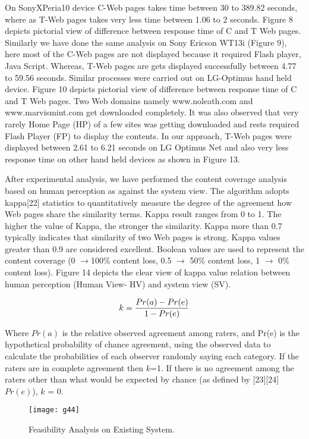 \documentclass[fleqn,twoside]{article}
\begin{document}
On SonyXPeria10 device C-Web pages takes time between 30 to 389.82 seconds, where as T-Web pages takes very less time between 1.06 to 2 seconds. Figure 8 depicts pictorial view of difference between response time of C and T Web pages. Similarly we have done the same analysis on Sony Ericson WT13i (Figure 9), here most of the C-Web pages are not displayed because it required Flash player, Java Script. Whereas, T-Web pages are gets displayed successfully between 4.77 to 59.56 seconds. Similar processes were carried out on LG-Optimus hand held device. Figure 10 depicts pictorial view of difference between response time of C and T Web pages. Two Web domains namely www.noleath.com and www.marvismint.com  get downloaded completely. It was also observed that very rarely Home Page (HP) of a few sites was getting downloaded and rests required Flash Player (FP) to display the contents. In our approach, T-Web pages were displayed between 2.61 to 6.21 seconds on LG Optimus Net and also very less response time on other hand held devices as shown in Figure 13. 

\vskip 2mm
After experimental analysis, we have performed the content coverage analysis based on human perception as against the system view. The algorithm adopts kappa[22] statistics to quantitatively measure the degree of the agreement how Web pages share the similarity terms. Kappa result ranges from 0 to 1. The higher the value of Kappa, the stronger the similarity. Kappa more than 0.7 typically indicates that similarity of two Web pages is strong. Kappa values greater than 0.9 are considered excellent. Boolean values are used to represent the content coverage (0 \begin{math} \rightarrow \end{math}100\% content loss, 0.5 \begin{math} \rightarrow \end{math} 50\% content loss, 1 \begin{math} \rightarrow \end{math} 0\% content loss). Figure 14 depicts the clear view of kappa value relation between human perception (Human View- HV) and system view (SV). 		

\begin{equation}
\tiny
k= \frac{Pr(a) - Pr(e)}{1 - Pr(e)}
\end{equation}


Where $Pr(a)$ is the relative observed agreement among raters, and Pr(e) is the hypothetical probability of chance agreement, using the observed data to calculate the probabilities of each observer randomly saying each category. If the raters are in complete agreement then $k$=1. If there is no agreement among the raters other than what would be expected by chance (as defined by [23][24] $Pr(e)$), $k$ = 0.
\begin{figure*}[!htbp]
\centering
\begin{center}
\texttt{[image: g44]}
\caption{Feasibility Analysis on Existing System.}
\end{center}
\end{figure*}
\end{document}
